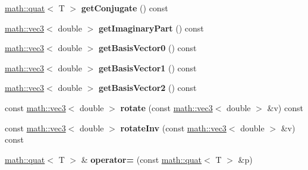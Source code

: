 \begin{DoxyCompactItemize}
\item 
\hypertarget{classmath_1_1quat_a615c15b7025a89a806c6234d4df8b0d7}{
\hyperlink{classmath_1_1quat}{math::quat}$<$ T $>$ {\bfseries getConjugate} () const }
\label{classmath_1_1quat_a615c15b7025a89a806c6234d4df8b0d7}

\item 
\hypertarget{classmath_1_1quat_afba077b1b6f2b2e2ff2a8c07f4730e88}{
\hyperlink{classmath_1_1vec3}{math::vec3}$<$ double $>$ {\bfseries getImaginaryPart} () const }
\label{classmath_1_1quat_afba077b1b6f2b2e2ff2a8c07f4730e88}

\item 
\hypertarget{classmath_1_1quat_aeec8b1f98358d060cd94bb98ba2b2591}{
\hyperlink{classmath_1_1vec3}{math::vec3}$<$ double $>$ {\bfseries getBasisVector0} () const }
\label{classmath_1_1quat_aeec8b1f98358d060cd94bb98ba2b2591}

\item 
\hypertarget{classmath_1_1quat_a2325a65c3acf083d03e9aed1822394a8}{
\hyperlink{classmath_1_1vec3}{math::vec3}$<$ double $>$ {\bfseries getBasisVector1} () const }
\label{classmath_1_1quat_a2325a65c3acf083d03e9aed1822394a8}

\item 
\hypertarget{classmath_1_1quat_ad4d54268923961972cf2e19fdc07d02d}{
\hyperlink{classmath_1_1vec3}{math::vec3}$<$ double $>$ {\bfseries getBasisVector2} () const }
\label{classmath_1_1quat_ad4d54268923961972cf2e19fdc07d02d}

\item 
\hypertarget{classmath_1_1quat_ae46cd63304b65093ff933fb127478b7f}{
const \hyperlink{classmath_1_1vec3}{math::vec3}$<$ double $>$ {\bfseries rotate} (const \hyperlink{classmath_1_1vec3}{math::vec3}$<$ double $>$ \&v) const }
\label{classmath_1_1quat_ae46cd63304b65093ff933fb127478b7f}

\item 
\hypertarget{classmath_1_1quat_a8512dc9b0cbc5932636feff7205d8c82}{
const \hyperlink{classmath_1_1vec3}{math::vec3}$<$ double $>$ {\bfseries rotateInv} (const \hyperlink{classmath_1_1vec3}{math::vec3}$<$ double $>$ \&v) const }
\label{classmath_1_1quat_a8512dc9b0cbc5932636feff7205d8c82}

\item 
\hypertarget{classmath_1_1quat_a4700bbf090d1e16d0bd159cca9ed9165}{
\hyperlink{classmath_1_1quat}{math::quat}$<$ T $>$ \& {\bfseries operator=} (const \hyperlink{classmath_1_1quat}{math::quat}$<$ T $>$ \&p)}
\label{classmath_1_1quat_a4700bbf090d1e16d0bd159cca9ed9165}


\end{DoxyCompactItemize}
